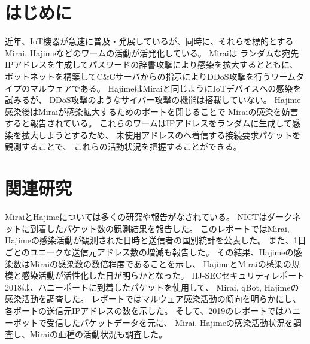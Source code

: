 \documentclass[a4j,fleqn,10pt]{jarticle}
\begin{document}

\maketitle




\section{はじめに}
近年、IoT機器が急速に普及・発展しているが、同時に、それらを標的とする Mirai, Hajimeなどのワームの活動が活発化している。
%
Miraiは
ランダムな宛先IPアドレスを生成してパスワードの辞書攻撃により感染を拡大するとともに、
ボットネットを構築してC\&Cサーバからの指示によりDDoS攻撃を行うワームタイプのマルウェアである。
%
HajimeはMiraiと同じようにIoTデバイスへの感染を試みるが、
DDoS攻撃のようなサイバー攻撃の機能は搭載していない。
Hajime感染後はMiraiが感染拡大するためのポートを閉じることで
Miraiの感染を妨害すると報告されている。
%
これらのワームはIPアドレスをランダムに生成して感染を拡大しようとするため、
未使用アドレスのへ着信する接続要求パケットを観測することで、
これらの活動状況を把握することができる。



\section{関連研究}
MiraiとHajimeについては多くの研究や報告がなされている。
%
NICTはダークネットに到着したパケット数の観測結果を報告した\cite{nict18}。
このレポートではMirai, Hajimeの感染活動が観測された日時と送信者の国別統計を公表した。
また、1日ごとのユニークな送信元アドレス数の増減も報告した。
その結果、Hajimeの感染数はMiraiの感染数の数倍程度であることを示し、
HajimeとMiraiの感染の規模と感染活動が活性化した日が明らかとなった。
%
IIJ-SECセキュリティレポート2018\cite{iij-sec18}は、ハニーポートに到着したパケットを使用して、
Mirai, qBot, Hajimeの感染活動を調査した。
レポートではマルウェア感染活動の傾向を明らかにし、
各ポートの送信元IPアドレスの数を示した。
そして、2019のレポート\cite{iij-sec19}ではハニーポットで受信したパケットデータを元に、
Mirai, Hajimeの感染活動状況を調査し、Miraiの亜種の活動状況も調査した。
%
\end{document}
